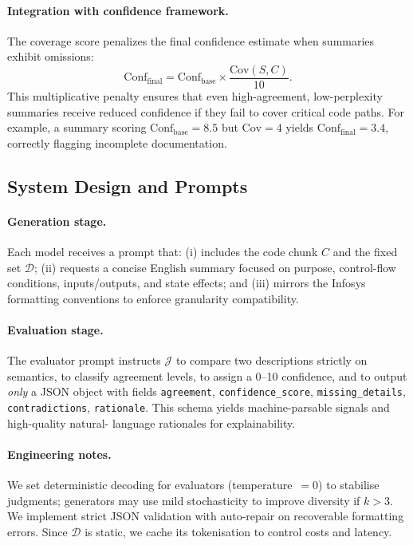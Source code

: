 \paragraph{Integration with confidence framework.}
The coverage score penalizes the final confidence estimate when summaries exhibit
omissions:
\begin{equation}
\mathrm{Conf}_{\mathrm{final}} = \mathrm{Conf}_{\mathrm{base}} \times
\frac{\mathrm{Cov}(S,C)}{10}.
\label{eq:conffinal}
\end{equation}
This multiplicative penalty ensures that even high-agreement, low-perplexity summaries
receive reduced confidence if they fail to cover critical code paths. For example, a
summary scoring $\mathrm{Conf}_{\mathrm{base}} = 8.5$ but $\mathrm{Cov} = 4$ yields
$\mathrm{Conf}_{\mathrm{final}} = 3.4$, correctly flagging incomplete documentation.


\subsection{System Design and Prompts}
\paragraph{Generation stage.}
Each model receives a prompt that: (i) includes the code chunk $C$ and
the fixed set $\mathcal{D}$; (ii) requests a concise English summary
focused on purpose, control-flow conditions, inputs/outputs, and state
effects; and (iii) mirrors the Infosys formatting conventions to enforce
granularity compatibility.

\paragraph{Evaluation stage.}
The evaluator prompt instructs $\mathcal{J}$ to compare two descriptions
strictly on semantics, to classify agreement levels, to assign a
0–10 confidence, and to output \emph{only} a JSON object with fields
\texttt{agreement}, \texttt{confidence\_score},
\texttt{missing\_details}, \texttt{contradictions}, \texttt{rationale}.
This schema yields machine-parsable signals and high-quality natural-
language rationales for explainability.

\paragraph{Engineering notes.}
We set deterministic decoding for evaluators (temperature~$=0$) to
stabilise judgments; generators may use mild stochasticity to improve
diversity if $k>3$. We implement strict JSON validation with
auto-repair on recoverable formatting errors. Since $\mathcal{D}$ is
static, we cache its tokenisation to control costs and latency.


